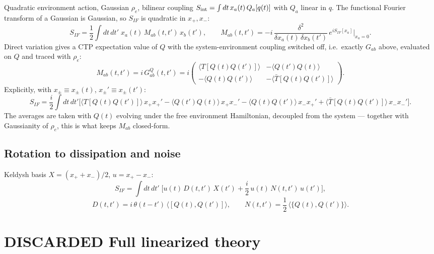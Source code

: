\documentclass[12pt,a4paper,oneside]{article}
\numberwithin{equation}{section}   %
\begin{document}
Quadratic environment action, Gaussian $\rho_e$, bilinear coupling $S_{\rm int}=\int dt\,x_a(t)\,Q_a[q(t)]$ with $Q_a$ linear in $q$. The functional Fourier transform of a Gaussian is Gaussian, so $S_{IF}$ is quadratic in $x_+,x_-$:
\begin{equation}
S_{IF} = \frac12\int dt\,dt'\;x_a(t)\,M_{ab}(t,t')\,x_b(t'),
\qquad
M_{ab}(t,t') = -i\,\frac{\delta^2}{\delta x_a(t)\,\delta x_b(t')}\,e^{iS_{IF}[x_a]}\Big|_{x_a=0}.
\end{equation}
Direct variation gives a CTP expectation value of $Q$ with the system-environment coupling switched off, i.e.\ exactly $G_{ab}$ above, evaluated on $Q$ and traced with $\rho_e$:
\begin{equation}
M_{ab}(t,t') = i\,G_{ab}^Q(t,t') = i
\begin{pmatrix}
\langle T[Q(t)Q(t')]\rangle & -\langle Q(t')Q(t)\rangle \\
-\langle Q(t)Q(t')\rangle & -\langle \bar T[Q(t)Q(t')]\rangle
\end{pmatrix}.
\end{equation}
Explicitly, with $x_\pm\equiv x_\pm(t)$, $x_\pm'\equiv x_\pm(t')$:
\begin{equation}
S_{IF} = \frac{i}{2}\int dt\,dt'\Big[
\langle T[Q(t)Q(t')]\rangle\,x_+x_+'
-\langle Q(t')Q(t)\rangle\,x_+x_-'
-\langle Q(t)Q(t')\rangle\,x_-x_+'
+\langle \bar T[Q(t)Q(t')]\rangle\,x_-x_-'
\Big].
\end{equation}
The averages are taken with $Q(t)$ evolving under the free environment Hamiltonian, decoupled from the system — together with Gaussianity of $\rho_e$, this is what keeps $M_{ab}$ closed-form.

\subsection*{Rotation to dissipation and noise}

Keldysh basis $X=(x_++x_-)/2$, $u=x_+-x_-$:
\begin{equation}
S_{IF} = \int dt\,dt'\;\Big[u(t)\,D(t,t')\,X(t') + \frac{i}{2}\,u(t)\,N(t,t')\,u(t')\Big],
\end{equation}
\begin{equation}
D(t,t') = i\,\theta(t-t')\,\big\langle[Q(t),Q(t')]\big\rangle,
\qquad
N(t,t') = \frac12\,\big\langle\{Q(t),Q(t')\}\big\rangle.
\end{equation}

\section{DISCARDED Full linearized theory}
\end{document}
